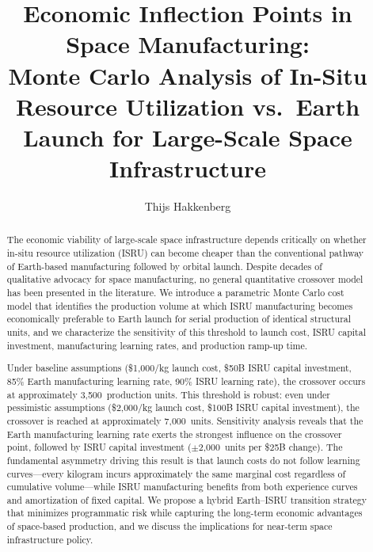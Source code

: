 \documentclass[preprint,12pt]{elsarticle}
\begin{document}
\begin{frontmatter}

\title{Economic Inflection Points in Space Manufacturing:\\ Monte Carlo Analysis of In-Situ Resource Utilization vs.\ Earth Launch for Large-Scale Space Infrastructure}

\author[dyson]{Thijs Hakkenberg}

\address[dyson]{Project Dyson, Open Research Initiative}

\begin{abstract}
The economic viability of large-scale space infrastructure depends critically on whether in-situ resource utilization (ISRU) can become cheaper than the conventional pathway of Earth-based manufacturing followed by orbital launch. Despite decades of qualitative advocacy for space manufacturing, no general quantitative crossover model has been presented in the literature. We introduce a parametric Monte Carlo cost model that identifies the production volume at which ISRU manufacturing becomes economically preferable to Earth launch for serial production of identical structural units, and we characterize the sensitivity of this threshold to launch cost, ISRU capital investment, manufacturing learning rates, and production ramp-up time.

Under baseline assumptions (\$1{,}000/kg launch cost, \$50B ISRU capital investment, 85\% Earth manufacturing learning rate, 90\% ISRU learning rate), the crossover occurs at approximately 3{,}500~production units. This threshold is robust: even under pessimistic assumptions (\$2{,}000/kg launch cost, \$100B ISRU capital investment), the crossover is reached at approximately 7{,}000~units. Sensitivity analysis reveals that the Earth manufacturing learning rate exerts the strongest influence on the crossover point, followed by ISRU capital investment ($\pm$2{,}000~units per \$25B change). The fundamental asymmetry driving this result is that launch costs do not follow learning curves---every kilogram incurs approximately the same marginal cost regardless of cumulative volume---while ISRU manufacturing benefits from both experience curves and amortization of fixed capital. We propose a hybrid Earth--ISRU transition strategy that minimizes programmatic risk while capturing the long-term economic advantages of space-based production, and we discuss the implications for near-term space infrastructure policy.
\end{abstract}


\end{frontmatter}
\end{document}
